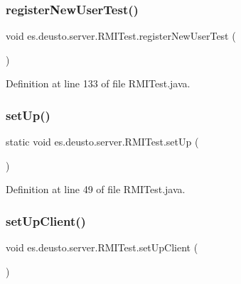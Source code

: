 \subsubsection{\texorpdfstring{register\+New\+User\+Test()}{registerNewUserTest()}}
{\footnotesize\ttfamily void es.\+deusto.\+server.\+R\+M\+I\+Test.\+register\+New\+User\+Test (\begin{DoxyParamCaption}{ }\end{DoxyParamCaption})}



Definition at line 133 of file R\+M\+I\+Test.\+java.

\mbox{\label{classes_1_1deusto_1_1server_1_1_r_m_i_test_a2cd940f51ed95fb8cc3676df31fc84ea}} 
\subsubsection{\texorpdfstring{set\+Up()}{setUp()}}
{\footnotesize\ttfamily static void es.\+deusto.\+server.\+R\+M\+I\+Test.\+set\+Up (\begin{DoxyParamCaption}{ }\end{DoxyParamCaption})\hspace{0.3cm}{\ttfamily [static]}}



Definition at line 49 of file R\+M\+I\+Test.\+java.

\mbox{\label{classes_1_1deusto_1_1server_1_1_r_m_i_test_ae18833c79a18cfde52e5e474d4dc9608}} 
\subsubsection{\texorpdfstring{set\+Up\+Client()}{setUpClient()}}
{\footnotesize\ttfamily void es.\+deusto.\+server.\+R\+M\+I\+Test.\+set\+Up\+Client (\begin{DoxyParamCaption}{ }\end{DoxyParamCaption})}



